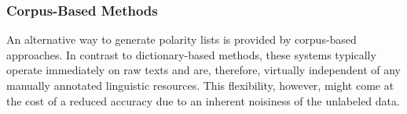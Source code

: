 





\subsubsection{Corpus-Based Methods}

An alternative way to generate polarity lists is provided by
corpus-based approaches.  In contrast to dictionary-based methods,
these systems typically operate immediately on raw texts and are,
therefore, virtually independent of any manually annotated linguistic
resources.  This flexibility, however, might come at the cost of a
reduced accuracy due to an inherent noisiness of the unlabeled data.

